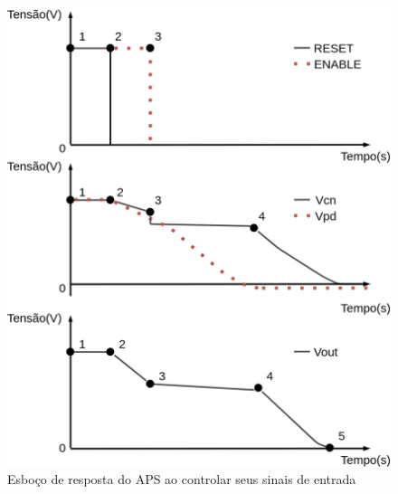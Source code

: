 \begin{figure}[htb]
	\caption{\label{figura_estagiosAPS}Esbo{\c c}o de resposta do APS ao controlar seus sinais de entrada}
	\begin{center}
	    \includegraphics[scale=0.3]{Imagens/estagiosAPS.png}
	\end{center}
\end{figure}


